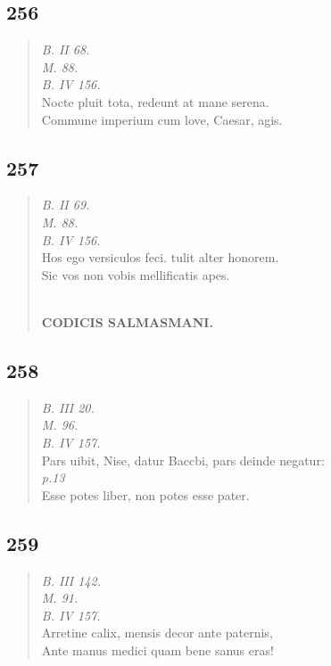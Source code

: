 \documentclass[11pt, a4paper]{report}
\begin{document}
            \subsection*{256}
      \begin{verse}
      \textit{B. II 68.} \\ \textit{M. 88.} \\ \textit{B. IV 156.} \\ Nocte pluit tota, redeunt at mane serena. \\ Commune imperium cum love, Caesar, agis. \\ 
      \end{verse}
  
            \subsection*{257}
      \begin{verse}
      \textit{B. II 69.} \\ \textit{M. 88.} \\ \textit{B. IV 156.} \\ Hos ego versiculos feci. tulit alter honorem. \\ Sic vos non vobis mellificatis apes. \\ 
        ﻿\pagebreak 
    \begin{center} \textbf{CODICIS SALMASMANI.} \end{center} \marginpar{[01]} 
      \end{verse}
  
            \subsection*{258}
      \begin{verse}
      \textit{B. III 20.} \\ \textit{M. 96.} \\ \textit{B. IV 157.} \\ Pars uibit, Nise, datur Baccbi, pars deinde negatur: \\ \textit{p.13} \\ Esse potes liber, non potes esse pater. \\ 
      \end{verse}
  
            \subsection*{259}
      \begin{verse}
      \textit{B. III 142.} \\ \textit{M. 91.} \\ \textit{B. IV 157.} \\ Arretine calix, mensis decor ante paternis, \\ Ante manus medici quam bene sanus eras! \\ 
      \end{verse}
  
\end{document}
